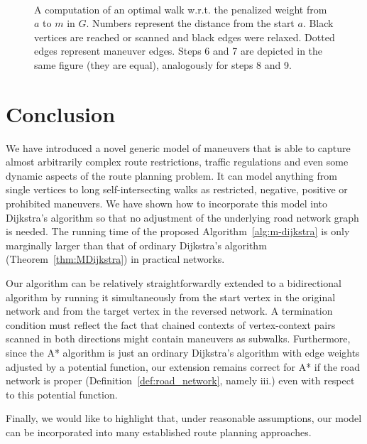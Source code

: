 \documentclass[envcountsect,envcountsame]{llncs}
\begin{document}
\begin{figure}[H]
  \centering
  ~
  ~
  \vskip 20pt
  ~
  ~
  \vskip 20pt
  ~
  ~
  \vskip 20pt
  ~
  ~
  \caption{A computation of an optimal walk w.r.t. the penalized weight from 
    $a$ to $m$ in $G$. Numbers represent the distance from the start $a$. 
    Black vertices are reached or scanned and black edges were relaxed.
    Dotted edges represent maneuver edges. 
    Steps 6 and 7 are depicted in the same figure (they are equal),
    analogously for steps 8 and 9.}
  \label{fig:example}
\end{figure}

\section{Conclusion}

We have introduced a novel generic model of maneuvers that is able to capture
almost arbitrarily complex route restrictions, traffic regulations and even
some dynamic aspects of the route planning problem. It can model anything 
from single vertices to long self-intersecting walks as restricted, negative, 
positive or prohibited maneuvers. We have shown how to incorporate this model 
into Dijkstra's algorithm so that no adjustment of the underlying road network 
graph is needed. The running time of the proposed Algorithm~\ref{alg:m-dijkstra} 
is only marginally larger than that of ordinary Dijkstra's algorithm 
(Theorem~\ref{thm:MDijkstra}) in practical networks. 

Our algorithm can be relatively straightforwardly extended to a bidirectional 
algorithm by running it simultaneously from the start vertex in the original 
network and from the target vertex in the reversed network. A termination
condition must reflect the fact that chained contexts of vertex-context pairs 
scanned in both directions might contain maneuvers as subwalks. 
Furthermore, since the A* algorithm is just an ordinary Dijkstra's algorithm 
with edge weights adjusted by a potential function, our extension remains
correct for A* if the road network is proper (Definition~\ref{def:road_network}, 
namely iii.) even with respect to this potential function.

Finally, we would like to highlight that, under reasonable assumptions, our 
model can be incorporated into many established route planning approaches.



\end{document}
